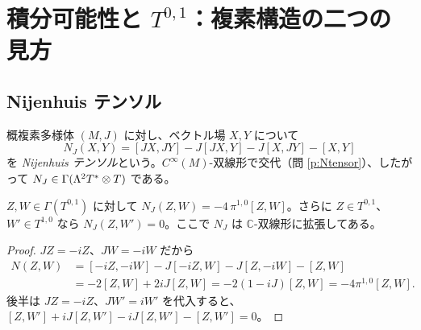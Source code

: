 \section{積分可能性と $T^{0,1}$：複素構造の二つの見方}\label{sec:integ}

\subsection{Nijenhuis テンソル}
概複素多様体 $(M,J)$ に対し、ベクトル場 $X,Y$ について
\[
N_J(X,Y)=[JX,JY]-J[JX,Y]-J[X,JY]-[X,Y]
\]
を \emph{Nijenhuis テンソル}という。$C^\infty(M)$-双線形で交代（問 \ref{p:Ntensor}）、したがって $N_J\in\Gamma(\Lambda^2T^*\otimes T)$ である。

\begin{lem}\label{lem:N}\tP
$Z,W\in\Gamma(T^{0,1})$ に対して $N_J(Z,W)=-4\,\pi^{1,0}[Z,W]$。さらに $Z\in T^{0,1}$、$W'\in T^{1,0}$ なら $N_J(Z,W')=0$。ここで $N_J$ は $\mathbb C$-双線形に拡張してある。
\end{lem}
\begin{proof}
$JZ=-iZ$、$JW=-iW$ だから
\begin{align*}
N(Z,W)&=[-iZ,-iW]-J[-iZ,W]-J[Z,-iW]-[Z,W]\\
&=-2[Z,W]+2iJ[Z,W]=-2(1-iJ)[Z,W]=-4\pi^{1,0}[Z,W].
\end{align*}
後半は $JZ=-iZ$、$JW'=iW'$ を代入すると、$[Z,W']+iJ[Z,W']-iJ[Z,W']-[Z,W']=0$。\qedhere
\end{proof}

